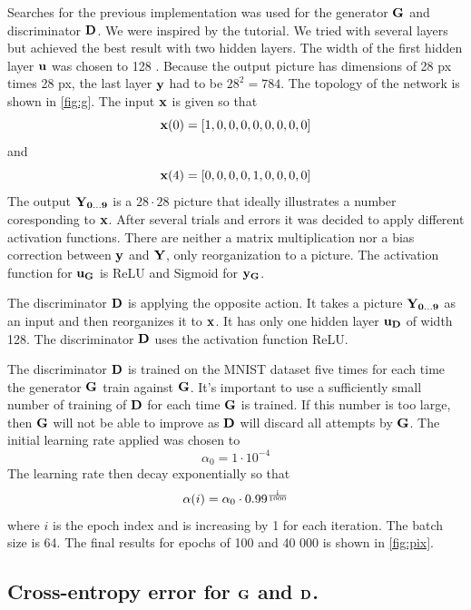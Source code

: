 \documentclass[../main.tex]{subfiles}
\begin{document}
Searches for the previous implementation was used for the generator $\mathbf{G}$ and discriminator $\mathbf{D}$. We were inspired by the tutorial. We tried with several layers but achieved the best result with two hidden layers. The width of the first hidden layer $\mathbf{u}$ was chosen to 128 \cite{tutorial-wgan}. Because the output picture has dimensions of 28 px times 28 px, the last layer $\mathbf{y}$ had to be $28^2=784$. The topology of the network  is shown in \autoref{fig:g}. The input $\mathbf{x}$ is given so that
\begin{equation}
    \mathbf{x}(0)=[1, 0, 0, 0, 0, 0, 0, 0, 0]
\end{equation}
and
\begin{equation}
    \mathbf{x}(4)=[0, 0, 0, 0, 1, 0, 0, 0, 0]
\end{equation}
The output $\mathbf{Y_{0...9}}$ is a $28\cdot28$  picture that ideally illustrates a number coresponding to $\mathbf{x}$. After several trials and errors it was decided to apply different activation functions. There are neither a matrix multiplication nor a bias correction between $\mathbf{y}$ and $\mathbf{Y}$, only reorganization to a picture. The activation function for $\mathbf{u_{G}}$ is ReLU and Sigmoid for $\mathbf{y_{G}}$.

The discriminator $\mathbf{D}$ is applying the opposite action. It takes a picture $\mathbf{Y_{0...9}}$ as an input and then reorganizes it to $\mathbf{x}$. It has only one hidden layer $\mathbf{u_{D}}$ of width 128. The discriminator $\mathbf{D}$ uses the activation function ReLU. 

The discriminator $\mathbf{D}$ is trained on the MNIST dataset five times for each time the generator $\mathbf{G}$ train against $\mathbf{G}$. It's important to use a sufficiently small number of training of $\mathbf{D}$ for each time $\mathbf{G}$ is trained. If this number is too large, then $\mathbf{G}$ will not be able to improve as $\mathbf{D}$ will discard all attempts by $\mathbf{G}$. The initial learning rate applied was chosen to
\begin{equation}
	\alpha_0 = 1 \cdot 10^{-4}
\end{equation}
The learning rate then decay exponentially so that
\begin{equation}
	\alpha(i)= \alpha_0 \cdot 0.99^{\frac{\rm i}{1000}}
\end{equation}
where $i$ is the epoch index and is increasing by 1 for each iteration. The batch size is 64. The final results for epochs of 100 and 40 000 is shown in \autoref{fig:pix}.

\subsection{Cross-entropy error for $\mathbf{G}$ and $\mathbf{D}$.}
\end{document}
